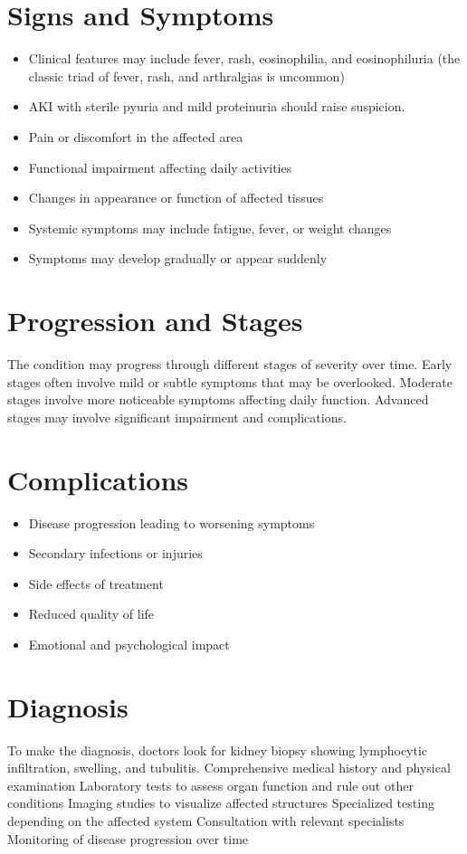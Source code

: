 \section{Signs and Symptoms}
\begin{itemize}[noitemsep]
  \item Clinical features may include fever, rash, eosinophilia, and eosinophiluria (the classic triad of fever, rash, and arthralgias is uncommon)
  \item AKI with sterile pyuria and mild proteinuria should raise suspicion.
  \item Pain or discomfort in the affected area
  \item Functional impairment affecting daily activities
  \item Changes in appearance or function of affected tissues
  \item Systemic symptoms may include fatigue, fever, or weight changes
  \item Symptoms may develop gradually or appear suddenly
\end{itemize}
\section{Progression and Stages}
The condition may progress through different stages of severity over time. Early stages often involve mild or subtle symptoms that may be overlooked. Moderate stages involve more noticeable symptoms affecting daily function. Advanced stages may involve significant impairment and complications.
\section{Complications}
\begin{itemize}[noitemsep]
  \item Disease progression leading to worsening symptoms
  \item Secondary infections or injuries
  \item Side effects of treatment
  \item Reduced quality of life
  \item Emotional and psychological impact
\end{itemize}
\section{Diagnosis}
To make the diagnosis, doctors look for kidney biopsy showing lymphocytic infiltration, swelling, and tubulitis. Comprehensive medical history and physical examination Laboratory tests to assess organ function and rule out other conditions Imaging studies to visualize affected structures Specialized testing depending on the affected system Consultation with relevant specialists Monitoring of disease progression over time

